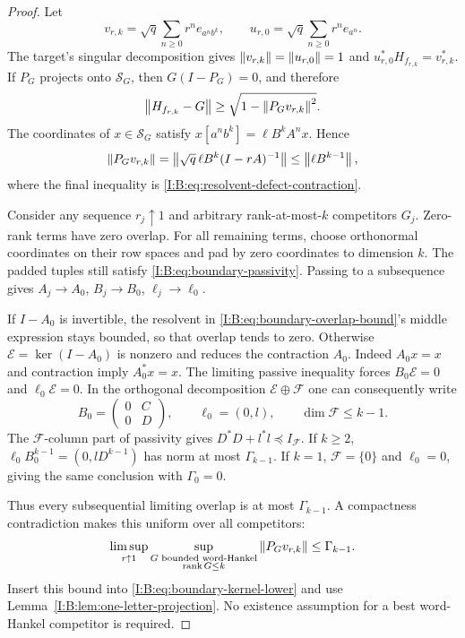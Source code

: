 \begin{proof}
Let
\[
 v_{r,k}=\sqrt q\sum_{n\ge0}r^n e_{a^n b^k},\qquad
 u_{r,0}=\sqrt q\sum_{n\ge0}r^n e_{a^n}.
\]
The target's singular decomposition gives
$\left\lVert v_{r,k}\right\rVert=\left\lVert u_{r,0}\right\rVert=1$ and
$u_{r,0}^*H_{f_{r,k}}=v_{r,k}^*$. If $P_G$ projects onto
$\mathcal S_G$, then $G(I-P_G)=0$, and therefore
\begin{equation}
 \left\lVert H_{f_{r,k}}-G\right\rVert
   \ge\sqrt{1-\left\lVert P_Gv_{r,k}\right\rVert^2}.
 \label{I:B:eq:boundary-kernel-lower}
\end{equation}
The coordinates of $x\in\mathcal S_G$ satisfy
$x[a^n b^k]=\ell B^kA^nx$. Hence
\begin{equation}
 \left\lVert P_Gv_{r,k}\right\rVert
 =\left\lVert\sqrt q\,\ell B^k(I-rA)^{-1}\right\rVert
 \le\left\lVert\ell B^{k-1}\right\rVert,
 \label{I:B:eq:boundary-overlap-bound}
\end{equation}
where the final inequality is \eqref{I:B:eq:resolvent-defect-contraction}.

Consider any sequence $r_j\uparrow1$ and arbitrary rank-at-most-$k$
competitors $G_j$. Zero-rank terms have zero overlap. For all remaining
terms, choose orthonormal coordinates on their row spaces and pad by
zero coordinates to dimension $k$. The padded tuples still satisfy
\eqref{I:B:eq:boundary-passivity}. Passing to a subsequence gives
$A_j\to A_0$, $B_j\to B_0$, $\ell_j\to\ell_0$.

If $I-A_0$ is invertible, the resolvent in
\eqref{I:B:eq:boundary-overlap-bound}'s middle expression stays bounded,
so that overlap tends to zero. Otherwise
$\mathcal E=\ker(I-A_0)$ is nonzero and reduces the contraction $A_0$.
Indeed $A_0x=x$ and contraction imply $A_0^*x=x$.
The limiting passive inequality forces $B_0\mathcal E=0$ and
$\ell_0\mathcal E=0$. In the orthogonal decomposition
$\mathcal E\oplus\mathcal F$ one can consequently write
\[
 B_0=\begin{pmatrix}0&C\\0&D\end{pmatrix},\qquad
 \ell_0=(0,l),\qquad \dim\mathcal F\le k-1.
\]
The $\mathcal F$-column part of passivity gives
$D^*D+l^*l\preceq I_{\mathcal F}$. If $k\ge2$,
$\ell_0B_0^{k-1}=(0,lD^{k-1})$ has norm at most $\Gamma_{k-1}$.
If $k=1$, $\mathcal F=\{0\}$ and $\ell_0=0$, giving the same conclusion
with $\Gamma_0=0$.

Thus every subsequential limiting overlap is at most $\Gamma_{k-1}$.
A compactness contradiction makes this uniform over all competitors:
\[
 \limsup_{r\uparrow1}\sup_{\substack{G\text{ bounded word-Hankel}\\
                                  \operatorname{rank}G\le k}}
       \left\lVert P_Gv_{r,k}\right\rVert\le\Gamma_{k-1}.
\]
Insert this bound into \eqref{I:B:eq:boundary-kernel-lower} and use
Lemma~\ref{I:B:lem:one-letter-projection}. No existence assumption for a
best word-Hankel competitor is required.
\end{proof}

